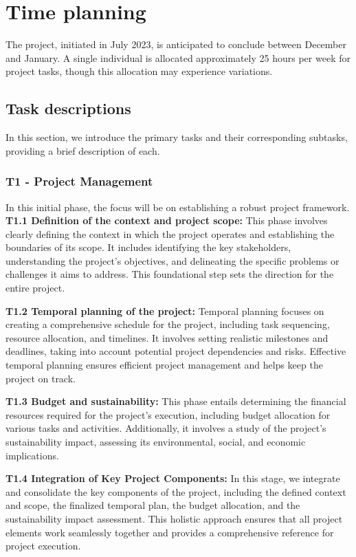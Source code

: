 \section{Time planning}

The project, initiated in July 2023, is anticipated to conclude between December and January. A single individual is allocated approximately 25 hours per week for project tasks, though this allocation may experience variations.

\subsection{Task descriptions}
In this section, we introduce the primary tasks and their corresponding subtasks, providing a brief description of each.
    \subsubsection{T1 - Project Management}
        In this initial phase, the focus will be on establishing a robust project framework.\\
        
        \textbf{T1.1 Definition of the context and project scope:}
            This phase involves clearly defining the context in which the project operates and establishing the boundaries of its scope. It includes identifying the key stakeholders, understanding the project's objectives, and delineating the specific problems or challenges it aims to address. This foundational step sets the direction for the entire project. 
            
        \textbf{T1.2 Temporal planning of the project:}
         Temporal planning focuses on creating a comprehensive schedule for the project, including task sequencing, resource allocation, and timelines. It involves setting realistic milestones and deadlines, taking into account potential project dependencies and risks. Effective temporal planning ensures efficient project management and helps keep the project on track.
         
        \textbf{T1.3 Budget and sustainability:}
        This phase entails determining the financial resources required for the project's execution, including budget allocation for various tasks and activities. Additionally, it involves a study of the project's sustainability impact, assessing its environmental, social, and economic implications. 
        
        \textbf{T1.4 Integration of Key Project Components:}
        In this stage, we integrate and consolidate the key components of the project, including the defined context and scope, the finalized temporal plan, the budget allocation, and the sustainability impact assessment. This holistic approach ensures that all project elements work seamlessly together and provides a comprehensive reference for project execution.
        
